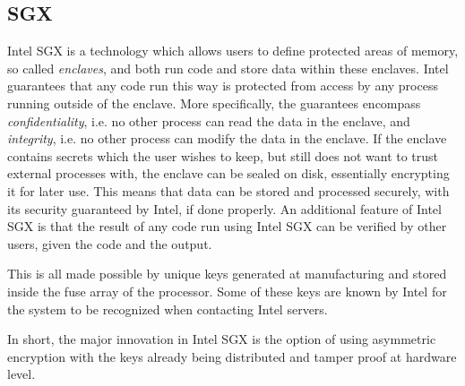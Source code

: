 \documentclass[12pt]{article}
\begin{document}
		\subsection{SGX}
		Intel SGX is a technology which allows users to define protected areas of memory, so called \textit{enclaves}, and both run code and store data within these enclaves.
		Intel guarantees \cite{sgx} that any code run this way is protected from access by any process running outside of the enclave. 
		More specifically, the guarantees encompass \textit{confidentiality}, i.e. no other process can read the data in the enclave, and \textit{integrity}, i.e. no other process can modify the data in the enclave. 
		If the enclave contains secrets which the user wishes to keep, but still does not want to trust external processes with, the enclave can be sealed on disk, essentially encrypting it for later use.
		This means that data can be stored and processed securely, with its security guaranteed by Intel, if done properly.
		An additional feature of Intel SGX is that the result of any code run using Intel SGX can be verified by other users, given the code and the output.

		This is all made possible by unique keys generated at manufacturing and stored inside the fuse array of the processor.
		Some of these keys are known by Intel for the system to be recognized when contacting Intel servers.

		In short, the major innovation in Intel SGX is the option of using asymmetric encryption with the keys already being distributed and tamper proof at hardware level.
\end{document}
